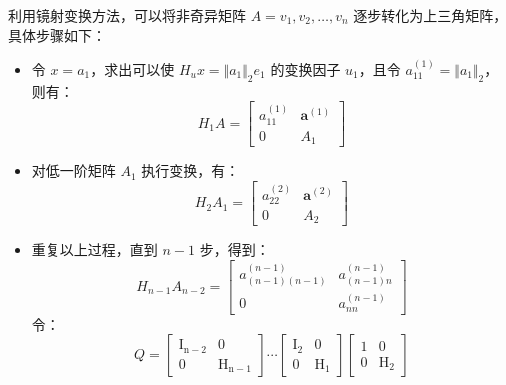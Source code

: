 利用镜射变换方法，可以将非奇异矩阵 $A={v_1,v_2,\dots,v_n}$ 逐步转化为上三角矩阵，具体步骤如下：
\begin{itemize}
    \item 令 $x=a_1$，求出可以使 $H_u x=\Vert a_1\Vert_2 e_1$ 的变换因子 $u_1$，且令 $a_{11}^{(1)}=\Vert a_1\Vert_2$，则有：
          \begin{equation*}
              H_{1}A=\begin{bmatrix}
                  a_{11}^{(1)} & \mathbf{a}^{(1)} \\
                  0            & A_1
              \end{bmatrix}
          \end{equation*}
    \item 对低一阶矩阵 $A_1$ 执行变换，有：
          \begin{equation*}
              H_{2}A_1=\begin{bmatrix}
                  a_{22}^{(2)} & \mathbf{a}^{(2)} \\
                  0            & A_2
              \end{bmatrix}
          \end{equation*}
    \item 重复以上过程，直到 $n-1$ 步，得到：
          \begin{equation}
              H_{n-1}A_{n-2}=\begin{bmatrix}
                  a_{(n-1)(n-1)}^{(n-1)} & a_{(n-1)n}^{(n-1)} \\
                  0                      & a_{nn}^{(n-1)}
              \end{bmatrix}
          \end{equation}
          令：
          \begin{equation*}
              Q=\begin{bmatrix}
                  \mathrm{I_{n-2}} & 0                \\
                  0                & \mathrm{H_{n-1}}
              \end{bmatrix}\cdots
              \begin{bmatrix}
                  \mathrm{I_{2}} & 0              \\
                  0              & \mathrm{H_{1}}
              \end{bmatrix}
              \begin{bmatrix}
                  1 & 0              \\
                  0 & \mathrm{H_{2}}

\end{bmatrix}
\end{equation*}
\end{itemize}
